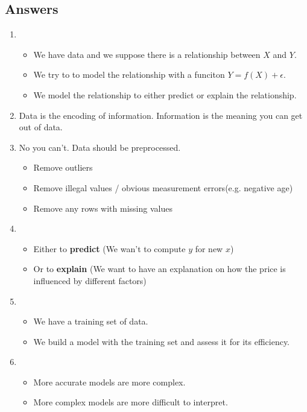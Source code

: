 \documentclass[11pt]{article}
\begin{document}
\subsection*{Answers}
\begin{enumerate}
    \item \begin{itemize}
              \item We have data and we suppose there is a relationship between $X$ and $Y$.
              \item We try to to model the relationship with a funciton $Y = f(X) + \epsilon$.
              \item We model the relationship to either predict or explain the relationship.
    \end{itemize}
    \item Data is the encoding of information.
    Information is the meaning you can get out of data.
    \item No you can't.
    Data should be preprocessed.
    \begin{itemize}
        \item Remove outliers
        \item Remove illegal values / obvious measurement errors(e.g. negative age)
        \item Remove any rows with missing values
    \end{itemize}
    \item \begin{itemize}
              \item Either to \textbf{ predict} (We wan't to compute $y$ for new $x$)
              \item Or to \textbf{explain} (We want to have an explanation on how the price is influenced by different
              factors)
    \end{itemize}
    \item \begin{itemize}
              \item We have a training set of data.
              \item We build a model with the training set and assess it for its efficiency.
    \end{itemize}
    \item \begin{itemize}
              \item More accurate models are more complex.
              \item More complex models are more difficult to interpret.

\end{itemize}
\end{enumerate}
\end{document}
